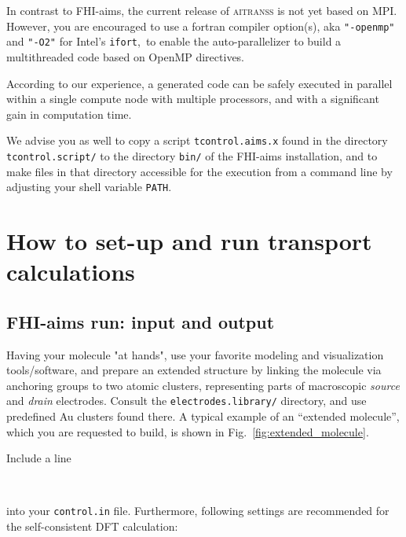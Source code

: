 In contrast to FHI-aims, the current release of \textsc{aitranss}
is not yet based on MPI. However, you are encouraged to use a fortran
compiler option(s), aka \verb,"-openmp", and \verb,"-O2", for Intel's
\verb,ifort,,\ to enable the auto-parallelizer to build a multithreaded
code based on OpenMP directives.

According to our experience, a generated code can be safely executed in
parallel within a single compute node with multiple processors, and with
a significant gain in computation time.

We advise you as well to copy a script \verb,tcontrol.aims.x, found
in the directory \linebreak \verb,tcontrol.script/, to the directory
\verb,bin/, of the FHI-aims installation, and to make files in that
directory accessible for the execution from a command line by adjusting
your shell variable \verb,PATH,.

\clearpage

\section{How to set-up and run transport calculations}
\label{sec:aitranss:howto}

\subsection{FHI-aims run: input and output} 
\label{subsec:fhiaims}

Having your molecule "at hands", use your favorite modeling and
visualization tools/\-software, and prepare an extended structure
by linking the molecule via anchoring groups to two atomic clusters,
representing parts of macroscopic \textit{source} and \textit{drain}
electrodes.  Consult the \verb,electrodes.library/, directory, and
use predefined Au clusters found there.  A typical example of an
``extended molecule'', which you are requested to build, is shown in
Fig.~\ref{fig:extended_molecule}.

Include a line

\noindent
\phantom{xxx}\ 

\noindent
into your \verb,control.in, file. Furthermore, following settings are
recommended for the self-consistent DFT calculation:

